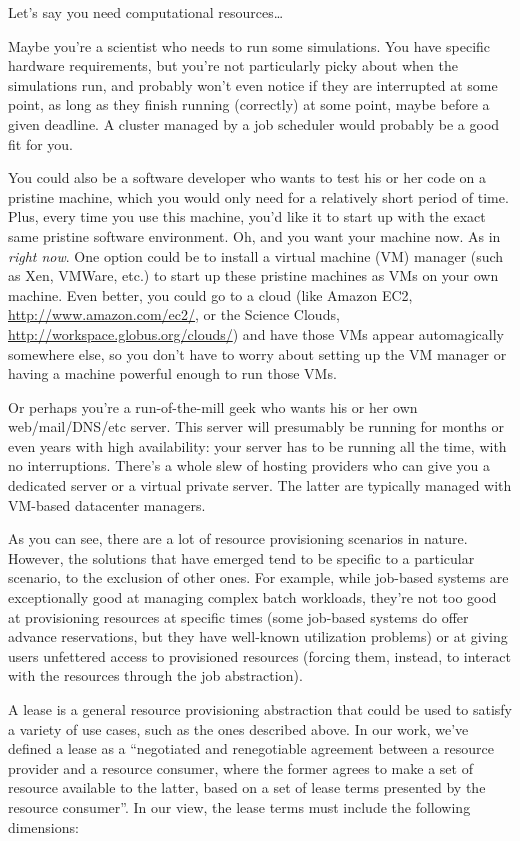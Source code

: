 Let's say you need computational resources\ldots

Maybe you're a scientist who needs to run some simulations. You have specific hardware requirements, but you're not particularly picky about when the simulations run, and probably won't even notice if they are interrupted at some point, as long as they finish running (correctly) at some point, maybe before a given deadline. A cluster managed by a job scheduler would probably be a good fit for you.

You could also be a software developer who wants to test his or her code on a pristine machine, which you would only need for a relatively short period of time. Plus, every time you use this machine, you'd like it to start up with the exact same pristine software environment. Oh, and you want your machine now. As in \emph{right now}. One option could be to install a virtual machine (VM) manager (such as Xen, VMWare, etc.) to start up these pristine machines as VMs on your own machine. Even better, you could go to a cloud (like Amazon EC2, \url{http://www.amazon.com/ec2/}, or the Science Clouds, \url{http://workspace.globus.org/clouds/}) and have those VMs appear automagically somewhere else, so you don't have to worry about setting up the VM manager or having a machine powerful enough to run those VMs.

Or perhaps you're a run-of-the-mill geek who wants his or her own web/mail/DNS/etc server. This server will presumably be running for months or even years with high availability: your server has to be running all the time, with no interruptions. There's a whole slew of hosting providers who can give you a dedicated server or a virtual private server. The latter are typically managed with VM-based datacenter managers.

As you can see, there are a lot of resource provisioning scenarios in nature. However, the solutions that have emerged tend to be specific to a particular scenario, to the exclusion of other ones. For example, while job-based systems are exceptionally good at managing complex batch workloads, they're not too good at provisioning resources at specific times (some job-based systems do offer advance reservations, but they have well-known utilization problems) or at giving users unfettered access to provisioned resources (forcing them, instead, to interact with the resources through the job abstraction).

A lease is a general resource provisioning abstraction that could be used to satisfy a variety of use cases, such as the ones described above. In our work, we've defined a lease as a ``negotiated and renegotiable agreement between a resource provider and a resource consumer, where the former agrees to make a set of resource available to the latter, based on a set of lease terms presented by the resource consumer''. In our view, the lease terms must include the following dimensions:

